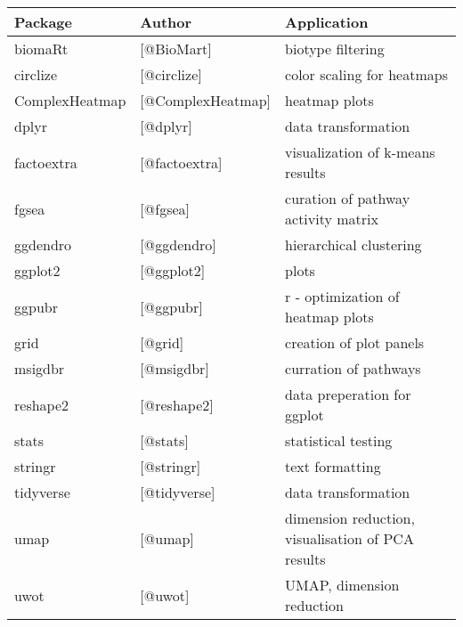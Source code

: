 \documentclass[
  parskip,
  oneside]{scrreprt}
\begin{document}
\begin{table}[!ht]
    \centering
    \begin{tabular}{|l|l|l|}
    \hline
        Package & Author & Application \\ \hline
        biomaRt & [@BioMart] & biotype filtering  \\ \hline
        circlize & [@circlize] & color scaling for heatmaps  \\ \hline
        ComplexHeatmap & [@ComplexHeatmap] & heatmap plots  \\ \hline
        dplyr & [@dplyr] & data transformation  \\ \hline
        factoextra & [@factoextra] & visualization of k-means results  \\ \hline
        fgsea & [@fgsea] & curation of pathway activity matrix  \\ \hline
        ggdendro & [@ggdendro] & hierarchical clustering  \\ \hline
        ggplot2 & [@ggplot2] & plots  \\ \hline
        ggpubr & [@ggpubr] & r - optimization of heatmap plots  \\ \hline
        grid & [@grid] & creation of plot panels  \\ \hline
        msigdbr & [@msigdbr] & curration of pathways  \\ \hline
        reshape2 & [@reshape2] & data preperation for ggplot  \\ \hline
        stats & [@stats] & statistical testing  \\ \hline
        stringr & [@stringr] & text formatting  \\ \hline
        tidyverse & [@tidyverse] & data transformation  \\ \hline
        umap & [@umap] & dimension reduction, visualisation of PCA results  \\ \hline
        uwot & [@uwot] & UMAP, dimension reduction  \\ \hline
    \end{tabular}
\end{table}
\end{document}
